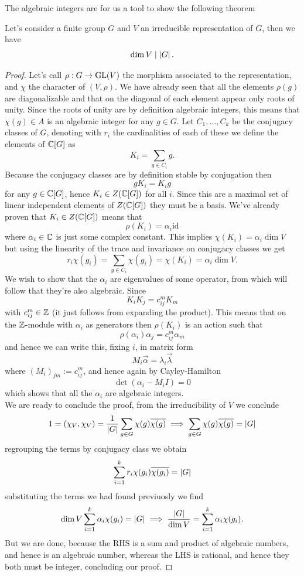 \documentclass[11pt]{scrartcl}
\begin{document}
	The algebraic integers are for us a tool to show the following theorem
	\begin{theorem}
		Let's consider a finite group $G$ and $V$ an irreducible representation of $G$, then we have
		$$\dim V \mid \left\lvert G \right\rvert.$$
	\end{theorem}
	\begin{proof}
		Let's call $\rho:G\to \operatorname{GL}(V)$ the morphism associated to the representation, and $\chi$ the character of $(V,\rho)$. We have already seen that all the elements $\rho(g)$ are diagonalizable and that on the diagonal of each element appear only roots of unity. Since the roots of unity are by definition algebraic integers, this means that $\chi(g)\in A$ is an algebraic integer for any $g\in G$. Let $C_1,\dots,C_k$ be the conjugacy classes of $G$, denoting with $r_i$ the cardinalities of each of these we define the elements of $\mathbb C[G]$ as
		$$K_i=\sum_{g\in C_i}g.$$
		Because the conjugacy classes are by definition stable by conjugation then
		$$gK_i=K_ig$$
		for any $g\in \mathbb C[G]$, hence $K_i\in Z(\mathbb C[G])$ for all $i$. Since this are a maximal set of linear independent elements of $Z(\mathbb C[G])$ they must be a basis. We've already proven that $K_i\in Z(\mathbb C[G])$ means that 
		$$\rho(K_i)=\alpha_i\text{id}$$
		where $\alpha_i\in \mathbb C$ is just some complex constant. This implies $\chi(K_i)=\alpha_i\dim V$ but using the linearity of the trace and invariance on conjugacy classes we get
		$$r_i\chi(g_i)=\sum_{g\in C_i}\chi(g_i)=\chi(K_i)=\alpha_i\dim V.$$
		We wish to show that the $\alpha_i$ are eigenvalues of some operator, from which will follow that they're also algebraic. Since 
		$$K_iK_j=c^m_{ij}K_m$$
		with $c_{ij}^m\in\mathbb Z$ (it just follows from expanding the product). This means that on the $\mathbb Z$-module with $\alpha_i$ as generators then $\rho(K_i)$ is an action such that
		$$\rho(\alpha_i)\alpha_j = c_{ij}^m \alpha_m$$
		and hence we can write this, fixing $i$, in matrix form
		$$M_i\vec{\alpha}=\lambda_i \vec{\lambda}$$
		where $\left(M_i\right)_{jm}:=c_{ij}^m$, and hence again by Cayley-Hamilton
		$$\det\left(\alpha_i-M_iI\right)=0$$
		which shows that all the $\alpha_i$ are algebraic integers. \\
		We are ready to conclude the proof, from the irreducibility of $V$ we conclude
		$$1=\left(\chi_V,\chi_V\right)=\frac{1}{\left\lvert G \right\rvert}\sum_{g\in G}\chi(g)\overline{\chi(g)}\implies \sum_{g\in G}\chi(g)\overline{\chi(g)}=\left\lvert G \right\rvert$$
		regrouping the terms by conjugacy class we obtain
		$$\sum_{i=1}^k r_i\chi(g_i)\overline{\chi(g_i)}=\left\lvert G \right\rvert$$ 
		substituting the terms we had found previuosly we find
		$$\dim V \sum_{i=1}^k \alpha_i \chi(g_i)=\left\lvert G \right\rvert \implies \frac{\left\lvert G \right\rvert}{\dim V}=\sum_{i=1}^k \alpha_i \chi(g_i).$$
		But we are done, because the RHS is a sum and product of algebraic numbers, and hence is an algebraic number, whereas the LHS is rational, and hence they both must be integer, concluding our proof.
	\end{proof}
	
\end{document}
